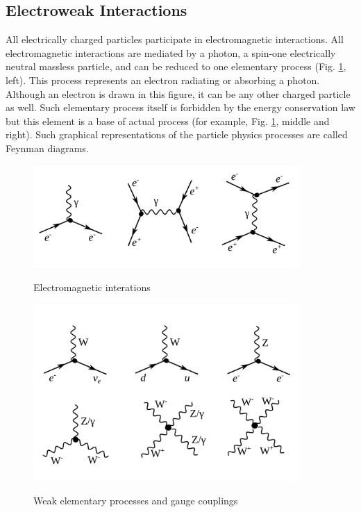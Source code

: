 \subsection{Electroweak Interactions}
\label{sec:Intro_Electroweak}




All electrically charged particles participate in electromagnetic interactions. All electromagnetic interactions are mediated by a photon, a spin-one electrically neutral massless particle, and can be reduced to one elementary process (Fig. \ref{fig:feynmEM}, left). This process represents an electron radiating or absorbing a photon. Although an electron is drawn in this figure, it can be any other charged particle as well. Such elementary process itself is forbidden by the energy conservation law but this element is a base of actual process (for example, Fig. \ref{fig:feynmEM}, middle and right). Such graphical representations of the particle physics processes are called Feynman diagrams.\\ 

\begin{figure}[htb]
  \begin{center}
    {\includegraphics[width=0.90\textwidth]{../figs/Intro/feynmEM.png}}
    \caption{Electromagnetic interations}
    \label{fig:feynmEM}
  \end{center}
\end{figure}

\begin{figure}[htb]
  \begin{center}
    {\includegraphics[width=0.90\textwidth]{../figs/Intro/feynmW.png}}
    \caption{Weak elementary processes and gauge couplings}
    \label{fig:feynmW}
  \end{center}
\end{figure}


